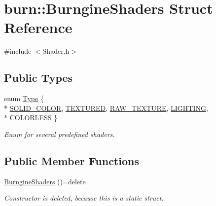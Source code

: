 \hypertarget{structburn_1_1_burngine_shaders}{\section{burn\-:\-:Burngine\-Shaders Struct Reference}
\label{structburn_1_1_burngine_shaders}
}


{\ttfamily \#include $<$Shader.\-h$>$}

\subsection*{Public Types}
\begin{DoxyCompactItemize}
\item 
enum \hyperlink{structburn_1_1_burngine_shaders_a2c339d4b838b7efe94ba8ef7f480ef41}{Type} \{ \\*
\hyperlink{structburn_1_1_burngine_shaders_a2c339d4b838b7efe94ba8ef7f480ef41a88513d98f02053992a4d753db14104e1}{S\-O\-L\-I\-D\-\_\-\-C\-O\-L\-O\-R}, 
\hyperlink{structburn_1_1_burngine_shaders_a2c339d4b838b7efe94ba8ef7f480ef41a9bd651b914b48fcb7a4a64c3f6e4111a}{T\-E\-X\-T\-U\-R\-E\-D}, 
\hyperlink{structburn_1_1_burngine_shaders_a2c339d4b838b7efe94ba8ef7f480ef41a53274ea9313d7d56a0c613f2f384d2c7}{R\-A\-W\-\_\-\-T\-E\-X\-T\-U\-R\-E}, 
\hyperlink{structburn_1_1_burngine_shaders_a2c339d4b838b7efe94ba8ef7f480ef41ac7bc9acc35a1eb3a3839b8fe6ead3c9f}{L\-I\-G\-H\-T\-I\-N\-G}, 
\\*
\hyperlink{structburn_1_1_burngine_shaders_a2c339d4b838b7efe94ba8ef7f480ef41a2b9f8e6b326d31ef61c68231aa0a37eb}{C\-O\-L\-O\-R\-L\-E\-S\-S}
 \}
\begin{DoxyCompactList}\small\item\em Enum for several predefined shaders. \end{DoxyCompactList}\end{DoxyCompactItemize}
\subsection*{Public Member Functions}
\begin{DoxyCompactItemize}
\item 
\hyperlink{structburn_1_1_burngine_shaders_a7839e417fb8b954b87ece696e48041eb}{Burngine\-Shaders} ()=delete
\begin{DoxyCompactList}\small\item\em Constructor is deleted, because this is a static struct. \end{DoxyCompactList}\end{DoxyCompactItemize}
